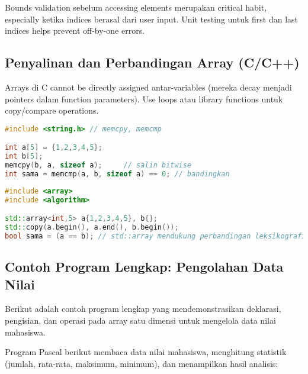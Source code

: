 \documentclass[../main.tex]{subfiles}
\begin{document}
Bounds validation sebelum accessing elements merupakan critical habit, especially ketika indices berasal dari user input. Unit testing untuk first dan last indices helps prevent off-by-one errors.

\subsection{Penyalinan dan Perbandingan Array (C/C++)}
Arrays di C cannot be directly assigned antar-variables (mereka decay menjadi pointers dalam function parameters). Use loops atau library functions untuk copy/compare operations.

\begin{lstlisting}[language=C, caption={Salin dan bandingkan isi array (C)}]
#include <string.h> // memcpy, memcmp

int a[5] = {1,2,3,4,5};
int b[5];
memcpy(b, a, sizeof a);     // salin bitwise
int sama = memcmp(a, b, sizeof a) == 0; // bandingkan
\end{lstlisting}

\begin{lstlisting}[language=C++, caption={Salin/cek kesetaraan (C++)}]
#include <array>
#include <algorithm>

std::array<int,5> a{1,2,3,4,5}, b{};
std::copy(a.begin(), a.end(), b.begin());
bool sama = (a == b); // std::array mendukung perbandingan leksikografis
\end{lstlisting}

\subsection{Contoh Program Lengkap: Pengolahan Data Nilai}

Berikut adalah contoh program lengkap yang mendemonstrasikan deklarasi, pengisian, dan operasi pada array satu dimensi untuk mengelola data nilai mahasiswa.

Program Pascal berikut membaca data nilai mahasiswa, menghitung statistik (jumlah, rata-rata, maksimum, minimum), dan menampilkan hasil analisis:
\end{document}
